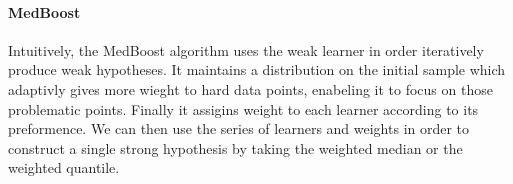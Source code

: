 \paragraph{MedBoost}
Intuitively, the MedBoost algorithm uses the weak learner in order iteratively produce weak hypotheses. It maintains a distribution on the initial sample which adaptivly gives more wieght to hard data points, enabeling it to focus on those problematic points. Finally it assigins weight to each learner according to its preformence. We can then use the series of learners and weights in order to construct a single strong hypothesis by taking the weighted median or the weighted quantile. 
